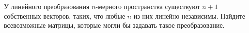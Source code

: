 \documentclass{article}
\begin{document}
У линейного преобразования $n$-мерного пространства существуют $n+1$ собственных векторов, таких, что любые $n$ из них линейно независимы. Найдите всевозможные матрицы, которые могли бы задавать такое преобразование.
\end{document}
